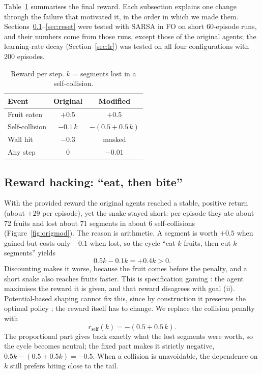 \documentclass{article}
\begin{document}
Table~\ref{tab:reward} summarises the final reward. Each subsection explains one change through the failure that motivated it, in the order in which we made them. Sections~\ref{sec:hacking}--\ref{sec:reset} were tested with SARSA in FO on short 60-episode runs, and their numbers come from those runs, except those of the original agents; the learning-rate decay (Section~\ref{sec:lr}) was tested on all four configurations with 200 episodes.

\begin{table}[t]
\caption{Reward per step. $k$ = segments lost in a self-collision.}
\label{tab:reward}
\vskip 0.1in
\begin{center}
\begin{small}
\begin{tabular}{lcc}
\toprule
Event & Original & Modified \\
\midrule
Fruit eaten        & $+0.5$      & $+0.5$ \\
Self-collision     & $-0.1\,k$   & $-(0.5+0.5\,k)$ \\
Wall hit           & $-0.3$      & masked \\
Any step           & $0$         & $-0.01$ \\
\bottomrule
\end{tabular}
\end{small}
\end{center}
\vskip -0.15in
\end{table}

\subsection{Reward hacking: ``eat, then bite''}
\label{sec:hacking}
With the provided reward the original agents reached a stable, positive return (about $+29$ per episode), yet the snake stayed short: per episode they ate about 72 fruits and lost about 71 segments in about 6 self-collisions (Figure~\ref{fig:origmod}).
The reason is arithmetic. A segment is worth $+0.5$ when gained but costs only $-0.1$ when lost, so the cycle ``eat $k$ fruits, then cut $k$ segments'' yields
\begin{equation}
0.5k - 0.1k = +0.4k > 0 .
\end{equation}
Discounting makes it worse, because the fruit comes before the penalty, and a short snake also reaches fruits faster.
This is specification gaming \cite{amodei2016,krakovna2020}: the agent maximises the reward it is given, and that reward disagrees with goal (ii).
Potential-based shaping cannot fix this, since by construction it preserves the optimal policy \cite{ng1999}; the reward itself has to change.
We replace the collision penalty with
\begin{equation}
r_{\text{self}}(k) = -(0.5 + 0.5\,k).
\label{eq:collision}
\end{equation}
The proportional part gives back exactly what the lost segments were worth, so the cycle becomes neutral; the fixed part makes it strictly negative, $0.5k-(0.5+0.5k)=-0.5$.
When a collision is unavoidable, the dependence on $k$ still prefers biting close to the tail.
\end{document}
